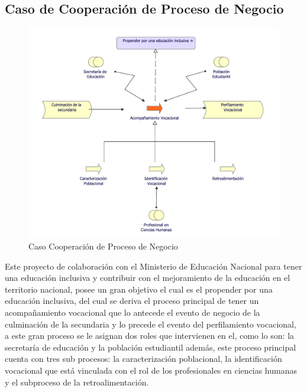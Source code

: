 \subsection{Caso de Cooperación de Proceso de Negocio}
\begin{figure}[h!]
	\centering
	\includegraphics[width=.9\linewidth]{imgs/caso/negocio/CoopProNegocio}
	\caption{Caso Cooperación de Proceso de Negocio}
\end{figure}

Este proyecto de colaboración con el Ministerio de Educación Nacional para tener una educación inclusiva y contribuir con el mejoramiento de la educación en el territorio nacional, posee un gran objetivo el cual es el propender por una educación inclusiva, del cual se deriva el proceso principal de tener un acompañamiento vocacional que lo antecede el evento de negocio de la culminación de la secundaria y lo precede el evento del perfilamiento vocacional, a este gran proceso se le asignan dos roles que intervienen en el, como lo son: la secretaría de educación y la población estudiantil además, este proceso principal cuenta con tres sub procesos: la caracterización poblacional, la identificación vocacional que está vinculada con el rol de los profesionales en ciencias humanas y el subproceso de la retroalimentación.